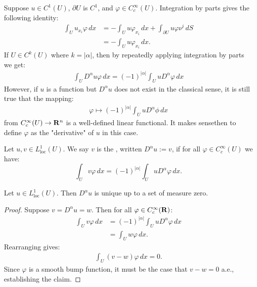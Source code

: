 \begin{example}
	Suppose $u \in C^1(U)$, $\partial U$ is $C^1$, and  $\varphi \in C_c^\infty(U)$. Integration by parts gives the following identity:
	\begin{align*}
		\int_{U}^{} u_{x_i}\varphi\,dx 
		&= - \int_{U}^{} u \varphi_{x_i}\,dx + \int_{\partial U}^{} u \varphi \nu^i \,dS \\
		&= - \int_{U}^{} u \varphi_{x_i}\,dx.
	\end{align*}
	If $U \in C^k(U)$ where $k = |\alpha|$, then by repeatedly applying integration by parts we get:
	\begin{align*}
		\int_{U}^{} D^\alpha u \varphi\,dx = (-1)^{|\alpha|} \int_{U}^{} u D^\alpha \varphi\,dx
	\end{align*}
	However, if $u$ is a function but $D^\alpha u$ does not exist in the classical sense, it is still true that the mapping:
	\begin{align*}
		\varphi \mapsto (-1)^{|\alpha|} \int_{U}^{} u D^\alpha \phi \,dx
	\end{align*}
	from $C_c^\infty(U) \rightarrow \mathbf{R}^n$ is a well-defined linear functional. It makes sensethen to define $\varphi$ as the "derivative" of $u$ in this case.
\end{example}

\begin{definition}
	Let $u,v \in L_{\text{loc}}^1(U)$. We say $v$ is the , written $D^\alpha u := v$, if for all $\varphi \in C^\infty_c(U)$ we have:
	\[
		\int_{U}^{} v \varphi\,dx = (-1)^|\alpha| \int_{U}^{} u D^\alpha \varphi\,dx.
	\] 
\end{definition}

\begin{proposition}
	Let $u \in L_{\text{loc}}^1(U)$. Then $D^\alpha u$ is unique up to a set of measure zero.
\end{proposition}
	\begin{proof}
		Suppose $v = D^\alpha u = w$. Then for all $\varphi \in C_c^\infty (\mathbf{R})$:
		\begin{align*}
			\int_{U}^{} v \varphi\,dx
			&= (-1)^{|\alpha|}\int_{U}^{} u D^\alpha \varphi \,dx \\
			&= \int_{U}^{} w \varphi\,dx.
		\end{align*}
		Rearranging gives:
		\begin{align*}
			\int_{U}^{} (v-w)\varphi\,dx = 0.
		\end{align*}
		Since $\varphi$ is a smooth bump function, it must be the case that $v - w = 0$ a.e., establishing the claim.
	\end{proof}

